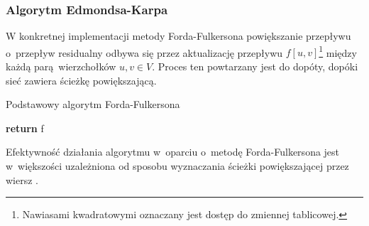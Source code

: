 \subsubsection{\textbf{Algorytm Edmondsa-Karpa}}\label{sss_edmonds_karp}
W konkretnej implementacji metody Forda-Fulkersona powiększanie przepływu o~przepływ residualny odbywa się przez aktualizację przepływu $f[u,v]$\footnote{Nawiasami kwadratowymi oznaczany jest dostęp do zmiennej tablicowej.} między każdą parą~wierzchołków $u,v \in V$.
Proces ten powtarzany jest do dopóty, dopóki sieć zawiera ścieżkę powiększającą.
\par{
  \begin{algorithm}
    \caption{Podstawowy algorytm Forda-Fulkersona}\label{alg_fordFulkersonConcrete}
    \begin{algorithmic}[1]




        \EndFor
        \label{shortestPath}


          \EndFor
        \EndWhile
        \State\textbf{return} f
      \EndFunction
    \end{algorithmic}
  \end{algorithm}
  Efektywność działania algorytmu w~oparciu o~metodę Forda-Fulkersona jest w~większości uzależniona od sposobu wyznaczania ścieżki powiększającej przez wiersz .
  }
